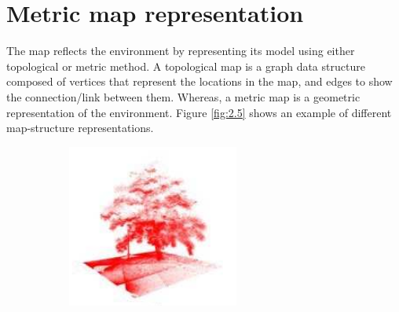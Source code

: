 \section{Metric map representation}
The map reﬂects the environment by representing its model using either topological or metric method. A topological map is a graph data structure composed of vertices that represent the locations in the map, and edges to show the connection/link between them. Whereas, a metric map is a geometric representation of the environment. Figure \ref{fig:2.5} shows an example of diﬀerent map-structure representations.
\begin{figure}[H]
    \centering
    \begin{subfigure}[H]{0.4\linewidth}
        \centering
        \includegraphics[width=\linewidth]{assets/2_5_a.png}
        \caption{{}}
        \label{fig:2.5a}
    \end{subfigure}
    \begin{subfigure}[H]{0.4\linewidth}
        \centering

\end{subfigure}
\end{figure}

